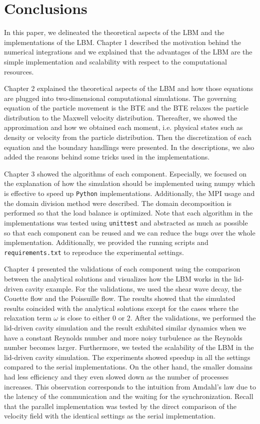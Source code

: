 \chapter{Conclusions}
\vspace{-8mm}
In this paper,
we delineated the theoretical aspects of the LBM
and the implementations of the LBM.
Chapter 1 described the motivation behind the numerical integrations
and 
we explained that the advantages of the LBM
are the simple implementation
and scalability with respect to the computational
resources.

Chapter 2 explained the theoretical aspects of the LBM
and how those equations are plugged into two-dimensional
computational simulations.
The governing equation of the particle movement is
the BTE and the BTE relaxes the particle distribution
to the Maxwell velocity distribution.
Thereafter, we showed the approximation and how we obtained each moment, i.e.
physical states such as density or velocity
from the particle distribution.
Then the discretization of each equation and
the boundary handlings were presented.
In the descriptions, we also added the
reasons behind some tricks used in the implementations.

Chapter 3 showed the algorithms of each component.
Especially, we focused on the explanation of how
the simulation should be implemented using numpy
which is effective to speed up {\tt Python} implementations.
Additionally, the MPI usage and the domain division method
were described.
The domain decomposition is performed so that the 
load balance is optimized.
Note that each algorithm in the implementations
was tested using {\tt unittest} and abstracted as much as possible
so that each component can be reused and we can reduce
the bugs over the whole implementation.
Additionally, we provided the running scripts and {\tt requirements.txt}
to reproduce the experimental settings.

Chapter 4 presented the validations of each component
using the comparison between the analytical solutions
and visualizes how the LBM works in the lid-driven cavity
example.
For the validations, we used the shear wave decay, 
the Couette flow and the Poissuille flow.
The results showed that the simulated results
coincided with the analytical solutions except for
the cases where the relaxation term $\omega$ is 
close to either $0$ or $2$.
After the validations, we performed the lid-driven cavity simulation
and the result exhibited similar dynamics when we have a constant Reynolds number
and more noisy turbulence as the Reynolds number becomes larger.
Furthermore, we tested the scalability of the LBM in the lid-driven cavity simulation.
The experiments showed speedup in all the settings compared to
the serial implementations.
On the other hand, the smaller domains had
less efficiency and they even slowed down as the number of processes increases.
This observation corresponds to the intuition from Amdahl's law due to
the latency of the communication and the waiting for the synchronization.
Recall that the parallel implementation was tested by the direct
comparison of the velocity field with the identical settings
as the serial implementation. 
